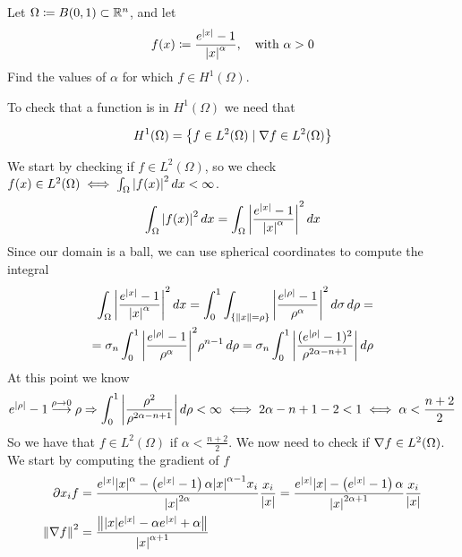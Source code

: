 \newpage
\begin{exercise}
    Let \(\Omega \coloneqq B(0, 1) \subset \mathbb{R}^n\), and let 
    \[
        f(x) \coloneqq \frac{e^{\abs{x}}-1}{\abs{x}^\alpha}, \quad \text{with } \alpha > 0
    \]
    Find the values of \(\alpha\) for which \(f \in H^1(\Omega)\).
\end{exercise}
To check that a function is in \(H^1(\Omega)\) we need that
\begin{remark}
    \[
        H^1(\Omega) = \left\{ f \in L^2(\Omega) \mid \nabla f \in L^2(\Omega) \right\}
    \]  
\end{remark}
We start by checking if \(f \in L^2(\Omega)\), so we check \(f(x) \in L^2(\Omega) \iff \int_\Omega \abs{f(x)}^2 \, dx < \infty\).
\[
    \begin{split}
        \int_\Omega \abs{f(x)}^2 \, dx = \int_\Omega \abs{\frac{e^{\abs{x}}-1}{\abs{x}^\alpha}}^2 \, dx
    \end{split}
\]
Since our domain is a ball, we can use spherical coordinates to compute the integral
\[
    \begin{split}
        \int_\Omega \abs{\frac{e^{\abs{x}}-1}{\abs{x}^\alpha}}^2 \, dx = \int_0^1 \int_{\left\{\norm{x} = \rho\right\}} \abs{\frac{e^{\abs{\rho}}-1}{\rho^\alpha}}^2 \, d\sigma \, d\rho = \\
        = \sigma_n \int_0^1 \abs{\frac{e^{\abs{\rho}}-1}{\rho^\alpha}}^2 \rho^{n-1} \, d\rho = \sigma_n \int_0^1 \abs{\frac{(e^{\abs{\rho}}-1)^2}{\rho^{2\alpha - n +1}}} \, d\rho
    \end{split}
\]
At this point we know 
\[
    \begin{split}
        e^{\abs{\rho}} -1 \overset{\rho \to 0}{\longrightarrow} \rho \Rightarrow \int_0^1 \abs{\frac{\rho^2}{\rho^{2\alpha - n + 1}}} \, d\rho < \infty \iff 2 \alpha - n + 1 -2 < 1 \iff \alpha < \frac{n + 2}{2}
    \end{split}
\]
So we have that \(f \in L^2(\Omega)\) if \(\alpha < \frac{n + 2}{2}\). We now need to check if \(\nabla f \in L^2(\Omega)\). We start by computing the gradient of \(f\)
\[
    \begin{split}
        \partial x_i f &= \frac{e^{\abs{x}} \abs{x}^{\alpha} - \left(e^{\abs{x}} - 1\right) \alpha \abs{x}^{\alpha - 1} x_i}{\abs{x}^{2\alpha}} \frac{x_i}{\abs{x}} = \frac{e^{\abs{x}} \abs{x} - \left(e^{\abs{x}} - 1\right) \alpha}{\abs{x}^{2\alpha + 1}} \frac{x_i}{\abs{x}} \\
        \norm{\nabla f}^2 &= \frac{\norm{\abs{x} e^{\abs{x}} - \alpha e^{\abs{x}} + \alpha}}{\abs{x}^{\alpha + 1}}
    \end{split}
\]
